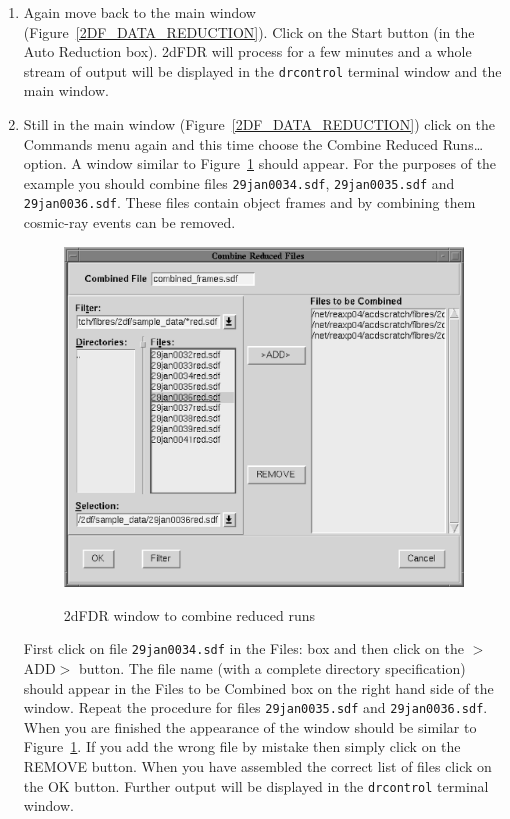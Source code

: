 \documentclass[twoside,11pt]{article}
\begin{document}
\begin{enumerate}
  \item Again move back to the main window
   (Figure~\ref{2DF_DATA_REDUCTION}).  Click on the {\sf Start}
   button (in the {\sf Auto Reduction} box).  2dFDR will process for a
   few minutes and a whole stream of output will be displayed in the
   {\tt drcontrol} terminal window and the main window.

  \item Still in the main window (Figure~\ref{2DF_DATA_REDUCTION})
   click on the {\sf Commands} menu again and this time choose the
   {\sf Combine Reduced Runs\ldots} option.  A window similar to
   Figure~\ref{2DF_COMBINE_RUNS} should appear.  For the purposes of
   the example you should combine files {\tt 29jan0034.sdf},
   {\tt 29jan0035.sdf} and {\tt 29jan0036.sdf}.  These files contain
   object frames and by combining them cosmic-ray events can be
   removed.

  \begin{figure}[htbp]
     \centering
     \includegraphics[totalheight=4in]{sc14_2df_combine_runs.ps}
     \begin{quote}
     \caption{2dFDR window to combine reduced runs
     \label{2DF_COMBINE_RUNS} }
     \end{quote}
  \end{figure}

   First click on file {\tt 29jan0034.sdf} in the {\sf Files:} box and
   then click on the {\sf $>$ADD$>$} button.  The file name (with a
   complete directory specification) should appear in the {\sf Files
   to be Combined} box  on the right hand side of the window.  Repeat
   the procedure for files {\tt 29jan0035.sdf} and {\tt 29jan0036.sdf}.
   When you are finished the appearance of the window should be similar
   to Figure~\ref{2DF_COMBINE_RUNS}.  If you add the wrong file by
   mistake then simply click on the {\sf REMOVE} button.  When you have
   assembled the correct list of files click on the {\sf OK} button.
   Further output will be displayed in the {\tt drcontrol} terminal window.


\end{enumerate}
\end{document}
